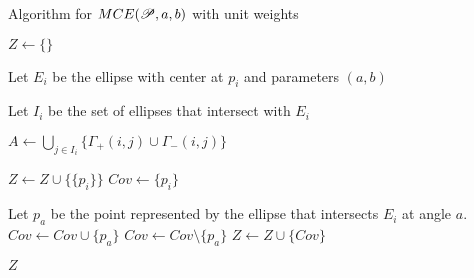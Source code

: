 \begin{algoritmo}
\caption{Algorithm for $MCE(\mathscr{P}, a, b)$ with unit weights}\label{algoritmo:mce1}

\begin{algorithmic}[1]

\item[]
\State $Z \gets \{\}$ 

\State Let $E_i$ be the ellipse with center at $p_i$ and parameters $(a,b)$

\State Let $I_i$ be the set of ellipses that intersect with $E_i$


\State $A \gets \bigcup_{j \in I_i} \{\Gamma_+(i,j) \cup \Gamma_-(i,j)\}$ 


\State $Z \gets Z \cup \{\{p_i\}\}$
\State $Cov \gets \{p_i\}$ 

 
\State Let $p_a$ be the point represented by the ellipse that intersects $E_i$ at angle $a$. 
\State $Cov \gets Cov \cup \{p_a\}$
\Else
\State $Cov \gets Cov \setminus \{p_a\}$
\EndIf
\State $Z \gets Z \cup \{Cov\}$
\EndFor
\EndFor
\EndFor

\State \Return $Z$
\EndProcedure


\end{algorithmic}
\end{algoritmo}

